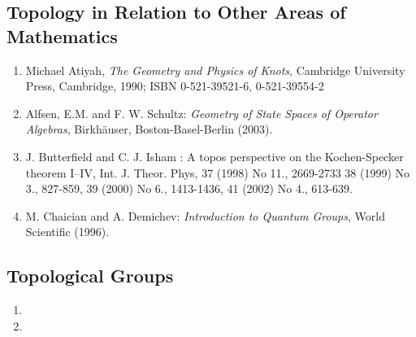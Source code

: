 \documentclass[12pt]{article}
\begin{document}
\subsection*{Topology in Relation to Other Areas of Mathematics}
\begin{enumerate}
\item Michael Atiyah, \emph{The Geometry and Physics of Knots}, Cambridge University Press, Cambridge, 1990; ISBN 0-521-39521-6, 0-521-39554-2
\item Alfsen, E.M. and F. W. Schultz: \emph{Geometry of State Spaces of
Operator Algebras}, Birkh\"auser, Boston-Basel-Berlin (2003).
\item J. Butterfield and C. J. Isham : A topos perspective on the Kochen-Specker theorem I--IV, Int. J. Theor. Phys, 37 (1998) No 11., 2669-2733 38 (1999) No 3., 827-859, 39 (2000) No 6., 1413-1436, 41 (2002) No 4., 613-639.
\item M. Chaician and A. Demichev: \emph{Introduction to Quantum Groups}, World Scientific (1996).


\end{enumerate}

\subsection*{Topological Groups}
\begin{enumerate}
\item {}
\item {}
\end{enumerate}
\end{document}
